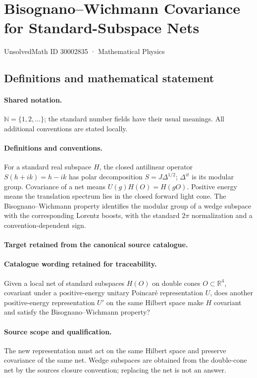 \documentclass[11pt]{article}
\begin{document}
\setcounter{section}{30002834}
\section{Bisognano–Wichmann Covariance for Standard-Subspace Nets}\label{30002835}
{\small UnsolvedMath ID 30002835 · Mathematical Physics}
\subsection{Definitions and mathematical statement}

\paragraph{Shared notation.}$\mathbb N=\{1,2,\ldots\}$; the standard number fields have their usual meanings. All additional conventions are stated locally.


\paragraph{Definitions and conventions.}
For a standard real subspace $H$, the closed antilinear operator $S(h+ik)=h-ik$ has polar decomposition $S=J\Delta^{1/2}$; $\Delta^{it}$ is its modular group. Covariance of a net means $U(g)H(O)=H(gO)$. Positive energy means the translation spectrum lies in the closed forward light cone. The Bisognano--Wichmann property identifies the modular group of a wedge subspace with the corresponding Lorentz boosts, with the standard $2\pi$ normalization and a convention-dependent sign.

\paragraph{Target retained from the canonical source catalogue.}
\paragraph{Catalogue wording retained for traceability.}
Given a local net of standard subspaces $H(O)$ on double cones $O\subset\mathbb R^4$, covariant under a positive-energy unitary Poincaré representation $U$, does another positive-energy representation $U'$ on the same Hilbert space make $H$ covariant and satisfy the Bisognano–Wichmann property?

\paragraph{Source scope and qualification.}
The new representation must act on the same Hilbert space and preserve covariance of the same net. Wedge subspaces are obtained from the double-cone net by the source\textquotesingle s closure convention; replacing the net is not an answer.
\end{document}
